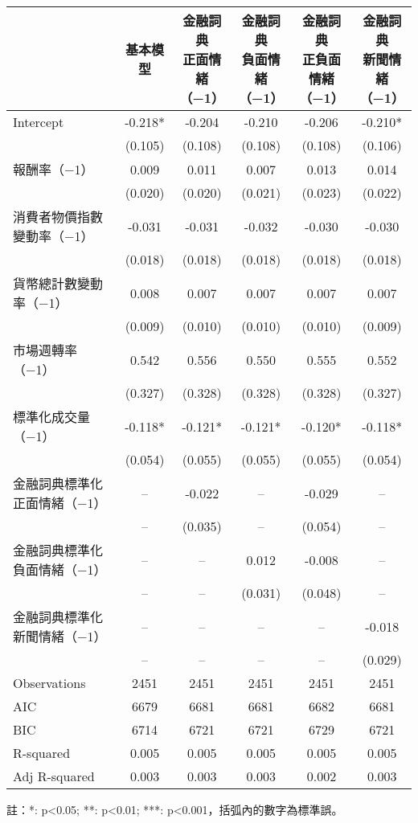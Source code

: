 \documentclass{article}
\begin{document}
    \fontsize{12pt}{14pt}\selectfont
    
    \begin{tabular}{lccccc}
\toprule
 & 基本模型 & \makecell{金融詞典\\正面情緒\\（−1）} & \makecell{金融詞典\\負面情緒\\（−1）} & \makecell{金融詞典\\正負面情緒\\（−1）} & \makecell{金融詞典\\新聞情緒\\（−1）} \\
\midrule
Intercept & -0.218* & -0.204 & -0.210 & -0.206 & -0.210* \\
 & (0.105) & (0.108) & (0.108) & (0.108) & (0.106) \\
報酬率（−1） & 0.009 & 0.011 & 0.007 & 0.013 & 0.014 \\
 & (0.020) & (0.020) & (0.021) & (0.023) & (0.022) \\
消費者物價指數變動率（−1） & -0.031 & -0.031 & -0.032 & -0.030 & -0.030 \\
 & (0.018) & (0.018) & (0.018) & (0.018) & (0.018) \\
貨幣總計數變動率（−1） & 0.008 & 0.007 & 0.007 & 0.007 & 0.007 \\
 & (0.009) & (0.010) & (0.010) & (0.010) & (0.009) \\
市場週轉率（−1） & 0.542 & 0.556 & 0.550 & 0.555 & 0.552 \\
 & (0.327) & (0.328) & (0.328) & (0.328) & (0.327) \\
標準化成交量（−1） & -0.118* & -0.121* & -0.121* & -0.120* & -0.118* \\
 & (0.054) & (0.055) & (0.055) & (0.055) & (0.054) \\
金融詞典標準化正面情緒（−1） & -- & -0.022 & -- & -0.029 & -- \\
 & -- & (0.035) & -- & (0.054) & -- \\
金融詞典標準化負面情緒（−1） & -- & -- & 0.012 & -0.008 & -- \\
 & -- & -- & (0.031) & (0.048) & -- \\
金融詞典標準化新聞情緒（−1） & -- & -- & -- & -- & -0.018 \\
 & -- & -- & -- & -- & (0.029) \\
\midrule
Observations &   2451 &   2451 &   2451 &   2451 &   2451 \\
AIC &    6679 &    6681 &    6681 &    6682 &    6681 \\
BIC &    6714 &    6721 &    6721 &    6729 &    6721 \\
R-squared &    0.005 &    0.005 &    0.005 &    0.005 &    0.005 \\
Adj R-squared &    0.003 &    0.003 &    0.003 &    0.002 &    0.003 \\
\bottomrule
\end{tabular}

    
    \fontsize{11pt}{14pt}\selectfont
    註：*: p<0.05; **: p<0.01; ***: p<0.001，括弧內的數字為標準誤。
    
\end{document}

